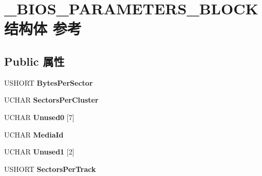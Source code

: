 \hypertarget{struct___b_i_o_s___p_a_r_a_m_e_t_e_r_s___b_l_o_c_k}{}\section{\+\_\+\+B\+I\+O\+S\+\_\+\+P\+A\+R\+A\+M\+E\+T\+E\+R\+S\+\_\+\+B\+L\+O\+C\+K结构体 参考}
\label{struct___b_i_o_s___p_a_r_a_m_e_t_e_r_s___b_l_o_c_k}
\subsection*{Public 属性}
\begin{DoxyCompactItemize}
\item 
\mbox{\label{struct___b_i_o_s___p_a_r_a_m_e_t_e_r_s___b_l_o_c_k_a820c524be106b9d05f21bb70b9712e37}} 
U\+S\+H\+O\+RT {\bfseries Bytes\+Per\+Sector}
\item 
\mbox{\label{struct___b_i_o_s___p_a_r_a_m_e_t_e_r_s___b_l_o_c_k_a1b7b53025a2f53e4cb9132cf2b41db79}} 
U\+C\+H\+AR {\bfseries Sectors\+Per\+Cluster}
\item 
\mbox{\label{struct___b_i_o_s___p_a_r_a_m_e_t_e_r_s___b_l_o_c_k_aec34985ea74206269c4e67ba283707f2}} 
U\+C\+H\+AR {\bfseries Unused0} \mbox{[}7\mbox{]}
\item 
\mbox{\label{struct___b_i_o_s___p_a_r_a_m_e_t_e_r_s___b_l_o_c_k_ada0f3fbe767ab82486756733f5f212e7}} 
U\+C\+H\+AR {\bfseries Media\+Id}
\item 
\mbox{\label{struct___b_i_o_s___p_a_r_a_m_e_t_e_r_s___b_l_o_c_k_a9cbe443f2b5cd71c9f16975bbd2812f8}} 
U\+C\+H\+AR {\bfseries Unused1} \mbox{[}2\mbox{]}
\item 
\mbox{\label{struct___b_i_o_s___p_a_r_a_m_e_t_e_r_s___b_l_o_c_k_aab8ec5cc3d5440a2984d9b7d08e89285}} 
U\+S\+H\+O\+RT {\bfseries Sectors\+Per\+Track}
\item 
\mbox{\label{struct___b_i_o_s___p_a_r_a_m_e_t_e_r_s___b_l_o_c_k_a5743a72dca121291e4fc7d3f98ed9043}} 

\end{DoxyCompactItemize}
